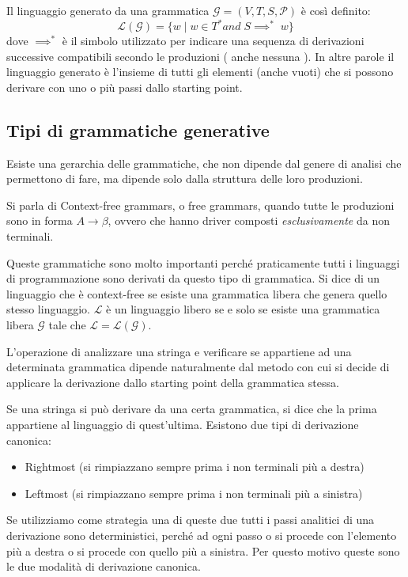 \documentclass[class=book, crop=false, oneside, 12pt]{standalone}
\begin{document}
Il linguaggio generato da una grammatica \(\mathcal{G} = (V,T,S,\mathcal{P})\) è così definito:
\begin{equation}
    \mathcal{L}(\mathcal{G}) = \{w \mid w \in T^* and \; S \implies^*\;  w\}
\end{equation}
dove \( \implies^*\) è il simbolo utilizzato per indicare una sequenza di derivazioni successive compatibili secondo le produzioni ( anche nessuna ). In altre parole il linguaggio generato è l'insieme di tutti gli elementi (anche vuoti) che si possono derivare con uno o più passi dallo starting point. 

\subsection{Tipi di grammatiche generative}
Esiste una gerarchia delle grammatiche, che non dipende dal genere di analisi che permettono di fare, ma dipende solo dalla struttura delle loro produzioni.

Si parla di Context-free grammars, o free grammars, quando tutte le produzioni sono in forma \(A \to \beta\), ovvero che hanno driver composti \emph{esclusivamente} da non terminali.

Queste grammatiche sono molto importanti perché praticamente tutti i linguaggi di programmazione sono derivati da questo tipo di grammatica.
Si dice di un linguaggio che è context-free se esiste una grammatica libera che genera quello stesso linguaggio.
\(\mathcal{L}\) è un linguaggio libero se e solo se esiste una grammatica libera \(\mathcal{G}\) tale che \(\mathcal{L}=\mathcal{L}(\mathcal{G})\).

L’operazione di analizzare una stringa e verificare se appartiene ad una determinata grammatica dipende naturalmente dal metodo con cui si decide di applicare la derivazione dallo starting point della grammatica stessa.

Se una stringa si può derivare da una certa grammatica, si dice che la prima appartiene al linguaggio di quest'ultima.
Esistono due tipi di derivazione canonica:
\begin{itemize}
    \item Rightmost (si rimpiazzano sempre prima i non terminali più a destra)
    \item Leftmost (si rimpiazzano sempre prima i non terminali più a sinistra)
\end{itemize}
Se utilizziamo come strategia una di queste due tutti i passi analitici di una derivazione sono deterministici, perché ad ogni passo o si procede con l’elemento più a destra o si procede con quello più a sinistra. Per questo motivo queste sono le due modalità di derivazione canonica.
\end{document}
